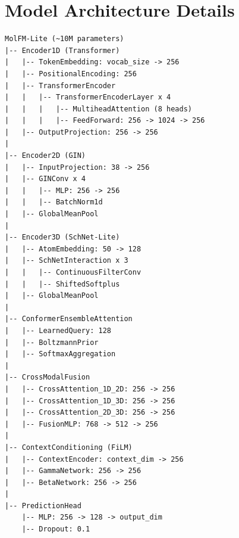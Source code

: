 \documentclass[11pt]{article}
\begin{document}
\section{Model Architecture Details}
\label{app:architecture}

\begin{verbatim}
MolFM-Lite (~10M parameters)
|-- Encoder1D (Transformer)
|   |-- TokenEmbedding: vocab_size -> 256
|   |-- PositionalEncoding: 256
|   |-- TransformerEncoder
|   |   |-- TransformerEncoderLayer x 4
|   |   |   |-- MultiheadAttention (8 heads)
|   |   |   |-- FeedForward: 256 -> 1024 -> 256
|   |-- OutputProjection: 256 -> 256
|
|-- Encoder2D (GIN)
|   |-- InputProjection: 38 -> 256
|   |-- GINConv x 4
|   |   |-- MLP: 256 -> 256
|   |   |-- BatchNorm1d
|   |-- GlobalMeanPool
|
|-- Encoder3D (SchNet-Lite)
|   |-- AtomEmbedding: 50 -> 128
|   |-- SchNetInteraction x 3
|   |   |-- ContinuousFilterConv
|   |   |-- ShiftedSoftplus
|   |-- GlobalMeanPool
|
|-- ConformerEnsembleAttention
|   |-- LearnedQuery: 128
|   |-- BoltzmannPrior
|   |-- SoftmaxAggregation
|
|-- CrossModalFusion
|   |-- CrossAttention_1D_2D: 256 -> 256
|   |-- CrossAttention_1D_3D: 256 -> 256
|   |-- CrossAttention_2D_3D: 256 -> 256
|   |-- FusionMLP: 768 -> 512 -> 256
|
|-- ContextConditioning (FiLM)
|   |-- ContextEncoder: context_dim -> 256
|   |-- GammaNetwork: 256 -> 256
|   |-- BetaNetwork: 256 -> 256
|
|-- PredictionHead
    |-- MLP: 256 -> 128 -> output_dim
    |-- Dropout: 0.1
\end{verbatim}
\end{document}
